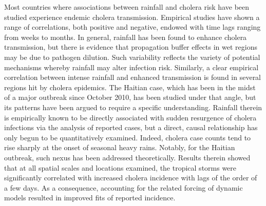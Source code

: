 Most countries where associations between rainfall and cholera risk have been studied experience endemic cholera transmission\cite{Rinaldo:ModelingKeyDrivers:2017}. Empirical studies have shown a range of correlations, both positive and negative, endowed with time lags ranging from weeks to months\cite{Ruiz-Moreno:CholeraSeasonalityMadras:2007,Emch:SeasonalityCholera1974:2008,Magny:CholeraOutbreakSenegal:2012}. In general, rainfall has been found to enhance cholera transmission, but there is evidence that propagation buffer effects in wet regions may be due to pathogen dilution\cite{Ruiz-Moreno:CholeraSeasonalityMadras:2007}. Such variability reflects the variety of potential mechanisms whereby rainfall may alter infection risk. Similarly, a clear empirical correlation between intense rainfall and enhanced transmission is found in several regions hit by cholera epidemics\cite{Magny:EnvironmentalSignaturesAssociated:2008,Rebaudet:EnvironmentalDeterminantsCholera:2013,Rebaudet:CholeraCoastalAfrica:2013,Jutla:WaterMarkerMonitored:2013,Gaudart:SpatioTemporalDynamicsCholera:2013}. The Haitian case, which has been in the midst of a major outbreak since October 2010\cite{Frerichs:NepaleseOriginCholera:2012,Gaudart:SpatioTemporalDynamicsCholera:2013,Kirpich:CholeraTransmissionOuest:2015,ERCCECHO:HaitiHurricaneMatthew:2016,Camacho:PredictionCholeraDynamics:2016,Pasetto:RealtimeProjectionsCholera:2017,Khan:AssessmentRiskCholera:2017}, has been studied under that angle, but its patterns have been argued to require a specific understanding\cite{Piarroux:UnderstandingCholeraEpidemic:2011}. Rainfall therein is empirically known to be directly associated with sudden resurgence of cholera infections via the analysis of reported cases\cite{Gaudart:SpatioTemporalDynamicsCholera:2013}, but a direct, causal relationship has only begun to be quantitatively examined\cite{Rinaldo:Reassessment20102011:2012,Eisenberg:ExaminingRainfallCholera:2013,Bertuzzo:ProbabilityExtinctionHaiti:2016}. Indeed, cholera case counts tend to rise sharply at the onset of seasonal heavy rains\cite{Adams:HaitiPreparesCholera:2012,Periago:EliminationCholeraTransmission:2012,Adams:CholeraHaitiTakes:2013}. Notably, for the Haitian outbreak, such nexus has been addressed theoretically\cite{Rinaldo:Reassessment20102011:2012,Eisenberg:ExaminingRainfallCholera:2013}. Results therein showed that at all spatial scales and locations examined, the tropical storms were significantly correlated with increased cholera incidence with lags of the order of a few days. As a consequence, accounting for the related forcing of dynamic models resulted in improved fits of reported incidence. 

